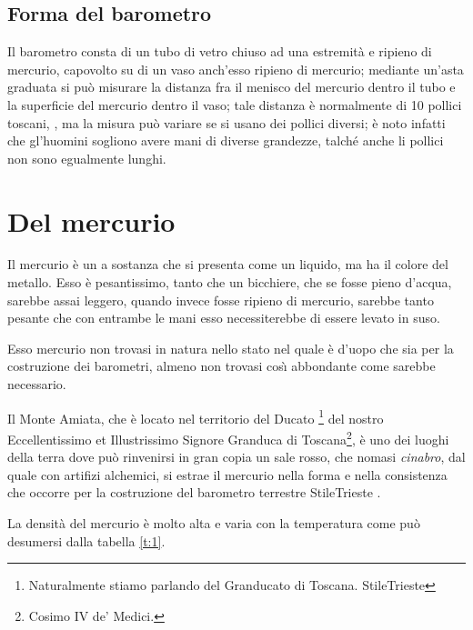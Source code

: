 \documentclass[%
,corpo=11.5pt
,twoside
,cucitura
,tipotesi=frontespizio
]{toptesi}
\begin{document}
\subsection{Forma del barometro}
Il barometro consta di un tubo di vetro chiuso ad una estremit{\`a} e
ripieno di mercurio, capovolto su di un vaso anch'esso ripieno di
mercurio; mediante un'asta graduata si pu{\`o} misurare la distanza fra
il menisco del mercurio dentro il tubo e la superficie del mercurio
dentro il vaso; tale distanza {\`e} normalmente di 10 pollici toscani,
\cite{tor1,tor2}, ma la misura pu{\`o} variare se si usano dei pollici
diversi; {\`e} noto infatti che gl'huomini sogliono avere mani di
diverse grandezze, talch{\'e} anche li pollici non sono egualmente
lunghi.
\section{Del mercurio}
Il mercurio {\`e} un a sostanza che si presenta come un liquido, ma ha il colore
del metallo. Esso {\`e} pesantissimo, tanto che un bicchiere, che se fosse pieno
d'acqua, sarebbe assai leggero, quando invece fosse ripieno di mercurio,
sarebbe tanto pesante che con entrambe le mani esso necessiterebbe di essere
levato in suso.

Esso mercurio non trovasi in natura nello stato nel quale {\`e} d'uopo che sia
per la costruzione dei barometri, almeno non trovasi cos{\`\i} abbondante come
sarebbe necessario.

\setcounter{footnote}{25}

Il Monte Amiata, che {\`e} locato nel territorio del Ducato%
\footnote{Naturalmente stiamo parlando del Granducato di Toscana.%
\expandafter\ifx\csname StileTrieste\endcsname\NoteWhiteLine\fi
}
del nostro Eccellentissimo et Illustrissimo Signore Granduca di Toscana\footnote{Cosimo IV de' Medici.}, {\`e} uno dei
luoghi della terra dove pu{\`o} rinvenirsi in gran copia un sale rosso, che
nomasi {\em cinabro}, dal quale con artifizi alchemici, si estrae il mercurio
nella forma e nella consistenza che occorre per la costruzione del barometro
terrestre%
\expandafter\ifx\csname StileTrieste\endcsname
{}\fi.

La densit{\`a} del mercurio {\`e} molto alta e varia con la temperatura come
pu{\`o} desumersi dalla tabella \ref{t:1}.
\end{document}
